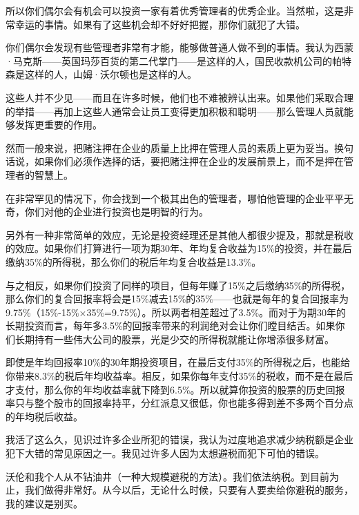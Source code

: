 所以你们偶尔会有机会可以投资一家有着优秀管理者的优秀企业。当然啦，这是非常幸运的事情。如果有了这些机会却不好好把握，那你们就犯了大错。
\par

你们偶尔会发现有些管理者非常有才能，能够做普通人做不到的事情。我认为西蒙·马克斯——英国玛莎百货的第二代掌门——是这样的人，国民收款机公司的帕特森是这样的人，山姆·沃尔顿也是这样的人。
\par

这些人并不少见——而且在许多时候，他们也不难被辨认出来。如果他们采取合理的举措——再加上这些人通常会让员工变得更加积极和聪明——那么管理人员就能够发挥更重要的作用。
\par

然而一般来说，把赌注押在企业的质量上比押在管理人员的素质上更为妥当。换句话说，如果你们必须作选择的话，要把赌注押在企业的发展前景上，而不是押在管理者的智慧上。
\par

在非常罕见的情况下，你会找到一个极其出色的管理者，哪怕他管理的企业平平无奇，你们对他的企业进行投资也是明智的行为。
\par

另外有一种非常简单的效应，无论是投资经理还是其他人都很少提及，那就是税收的效应。如果你们打算进行一项为期30年、年均复合收益为15\%的投资，并在最后缴纳35\%的所得税，那么你们的税后年均复合收益是13.3\%。
\par

与之相反，如果你们投资了同样的项目，但每年赚了15\%之后缴纳35\%的所得税，那么你们的复合回报率将会是15\%减去15\%的35\%——也就是每年的复合回报率为9.75\%（15\%-15\%×35\%=9.75\%）。所以两者相差超过了3.5\%。而对于为期30年的长期投资而言，每年多3.5\%的回报率带来的利润绝对会让你们瞠目结舌。如果你们长期持有一些伟大公司的股票，光是少交的所得税就能让你增添很多财富。
\par

即使是年均回报率10\%的30年期投资项目，在最后支付35\%的所得税之后，也能给你带来8.3\%的税后年均收益率。相反，如果你每年支付35\%的税收，而不是在最后才支付，那么你的年均收益率就下降到6.5\%。所以就算你投资的股票的历史回报率只与整个股市的回报率持平，分红派息又很低，你也能多得到差不多两个百分点的年均税后收益。
\par

我活了这么久，见识过许多企业所犯的错误，我认为过度地追求减少纳税额是企业犯下大错的常见原因之一。我见过许多人因为太想避税而犯下可怕的错误。
\par

沃伦和我个人从不钻油井（一种大规模避税的方法）。我们依法纳税。到目前为止，我们做得非常好。从今以后，无论什么时候，只要有人要卖给你避税的服务，我的建议是别买。
\par

